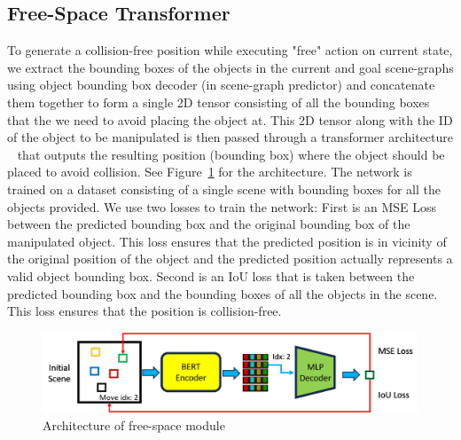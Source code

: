 \subsection{Free-Space Transformer}
To generate a collision-free position while executing "free" action on current state, we extract the bounding boxes of the objects in the current and goal scene-graphs using object bounding box decoder (in scene-graph predictor) and concatenate them together to form a single 2D tensor consisting of all the bounding boxes that the we need to avoid placing the object at. This 2D tensor along with the ID of the object to be manipulated is then passed through a transformer architecture ~\cite{Vaswani2017AttentionIA} that outputs the resulting position (bounding box) where the object should be placed to avoid collision. See Figure~\ref{fig:free-arch} for the architecture. The network is trained on a dataset consisting of a single scene with bounding boxes for all the objects provided. We use two losses to train the network: First is an MSE Loss between the predicted bounding box and the original bounding box of the manipulated object. This loss ensures that the predicted position is in vicinity of the original position of the object and the predicted position actually represents a valid object bounding box. Second is an IoU loss that is taken between the predicted bounding box and the bounding boxes of all the objects in the scene. This loss ensures that the position is collision-free.

\begin{figure}
    \centering
    \includegraphics[width=\textwidth]{part-2/free-arch.png}
    \caption{Architecture of free-space module}
    \label{fig:free-arch}
\end{figure}

